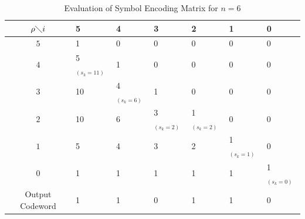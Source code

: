 \begin{table}[!htbp]
\centering \caption{Evaluation of Symbol Encoding Matrix for $n=6$}
\begin{tabular}{|c|llllll|} \hline \hline
$\rho \diagdown i$ & 5 & 4 & 3 & 2 & 1 & 0 \\  \hline \hline
$5$ & 1 & 0 & 0 & 0 & 0 & 0 \\   \hline
$4$ & 5$_{(s_k=11)}$ & 1 & 0 & 0 & 0 & 0 \\   \hline
$3$ & 10 & 4$_{(s_k=6)}$ & 1 & 0 & 0 & 0 \\   \hline
$2$ & 10 & 6 & 3$_{(s_k=2)}$ & 1$_{(s_k=2)}$ & 0 & 0 \\   \hline
$1$ & 5 & 4 & 3 & 2 & 1$_{(s_k=1)}$ & 0 \\   \hline
$0$ & 1 & 1 & 1 & 1 & 1 & 1$_{(s_k=0)}$ \\  \hline \hline
Output Codeword & 1 & 1 & 0 & 1 & 1 & 0 \\  \hline
\end{tabular}
\label{tab:encodeMatrix}
\end{table}


